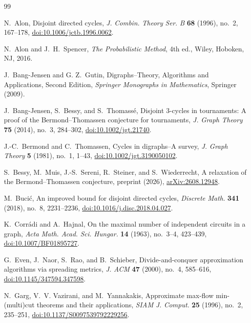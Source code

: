 \documentclass[10pt,a4paper]{article}
\numberwithin{equation}{section}
\begin{document}
\begin{thebibliography}{99}
\small
\setlength{\parskip}{0pt}
\setlength{\itemsep}{0pt}
\setlength{\parsep}{0pt}
\setlength{\labelsep}{0.3em}


N.~Alon, Disjoint directed cycles,
\emph{J. Combin. Theory Ser. B} \textbf{68} (1996), no.~2, 167--178,
\href{https://doi.org/10.1006/jctb.1996.0062}{doi:10.1006/jctb.1996.0062}.


N.~Alon and J.~H.~Spencer,
\emph{The Probabilistic Method},
4th ed., Wiley, Hoboken, NJ, 2016.

J.~Bang{-}Jensen and G. Z.~Gutin,
Digraphs--Theory, Algorithms and Applications, Second Edition,
\emph{Springer Monographs in Mathematics},
Springer (2009). 

J.~Bang-Jensen, S.~Bessy, and S.~Thomass\'{e},
Disjoint 3-cycles in tournaments: A proof of the
Bermond--Thomassen conjecture for tournaments,
\emph{J. Graph Theory} \textbf{75} (2014),
no.~3, 284--302,
\href{https://doi.org/10.1002/jgt.21740}{doi:10.1002/jgt.21740}.


J.-C.~Bermond and C.~Thomassen,
Cycles in digraphs--A survey,
\emph{J. Graph Theory} \textbf{5} (1981), no.~1, 1--43,
\href{https://doi.org/10.1002/jgt.3190050102}{doi:10.1002/jgt.3190050102}.


S.~Bessy, M.~Muis, J.-S.~Sereni, R.~Steiner, and S.~Wiederrecht,
A relaxation of the Bermond--Thomassen conjecture,
preprint (2026),
\href{https://arxiv.org/abs/2608.12948}{arXiv:2608.12948}.


M.~Buci\'c, An improved bound for disjoint directed cycles,
\emph{Discrete Math.} \textbf{341} (2018), no.~8, 2231--2236,
\href{https://doi.org/10.1016/j.disc.2018.04.027}{doi:10.1016/j.disc.2018.04.027}.


K.~Corr\'{a}di and A.~Hajnal,
On the maximal number of independent circuits in a graph,
\emph{Acta Math. Acad. Sci. Hungar.} \textbf{14} (1963),
no.~3--4, 423--439,
\href{https://doi.org/10.1007/BF01895727}{doi:10.1007/BF01895727}.


G.~Even, J.~Naor, S.~Rao, and B.~Schieber, Divide-and-conquer
approximation algorithms via spreading metrics,
\emph{J. ACM} \textbf{47} (2000), no.~4, 585--616,
\href{https://doi.org/10.1145/347594.347598}{doi:10.1145/347594.347598}.


N.~Garg, V.~V. Vazirani, and M.~Yannakakis, Approximate max-flow
min-(multi)cut theorems and their applications,
\emph{SIAM J. Comput.} \textbf{25} (1996), no.~2, 235--251,
\href{https://doi.org/10.1137/S0097539792229256}{doi:10.1137/S0097539792229256}.



\end{thebibliography}
\end{document}
